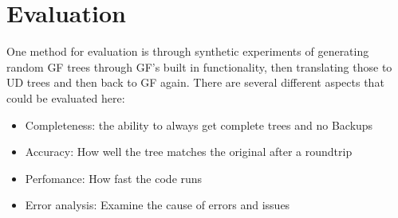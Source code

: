 \documentclass{article}
\begin{document}

\section{Evaluation}
One method for evaluation is through synthetic experiments of generating random GF trees through GF's built in functionality, then translating those to UD trees and then back to GF again. There are several different aspects that could be evaluated here:
\begin{itemize}
    \item Completeness: the ability to always get complete trees and no Backups
    \item Accuracy: How well the tree matches the original after a roundtrip
    \item Perfomance: How fast the code runs
    \item Error analysis: Examine the cause of errors and issues
\end{itemize}
\end{document}
